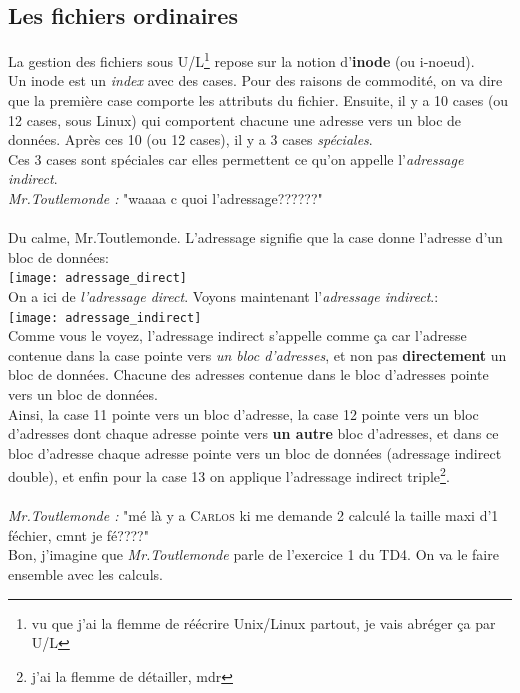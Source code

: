 \documentclass{report}
\begin{document}
\subsection{Les fichiers ordinaires}
La gestion des fichiers sous U/L\footnote{vu que j'ai la flemme de réécrire Unix/Linux partout, je vais abréger ça par U/L} repose sur la notion d'\textbf{inode} (ou i-noeud).\\
Un inode est un \emph{index} avec des cases. Pour des raisons de commodité, on va dire que la première case comporte les attributs du fichier. Ensuite, il y a 10 cases (ou 12 cases, sous Linux) qui comportent chacune une adresse vers un bloc de données. Après ces 10 (ou 12 cases), il y a 3 cases \emph{spéciales}.\\
Ces 3 cases sont spéciales car elles permettent ce qu'on appelle l'\emph{adressage indirect}.\newline
\\
\emph{Mr.Toutlemonde :} "waaaa c quoi l'adressage??????"\\
\\
Du calme, Mr.Toutlemonde. L'adressage signifie que la case donne l'adresse d'un bloc de données:
\\
\texttt{[image: adressage\_direct]}
\\
On a ici de \emph{l'adressage direct}. Voyons maintenant l'\emph{adressage indirect}.:
\\
\texttt{[image: adressage\_indirect]} \\
Comme vous le voyez, l'adressage indirect s'appelle comme ça car l'adresse contenue dans la case pointe vers \emph{un bloc d'adresses}, et non pas \textbf{directement} un bloc de données. Chacune des adresses contenue dans le bloc d'adresses pointe vers un bloc de données.\\
Ainsi, la case 11 pointe vers un bloc d'adresse, la case 12 pointe vers un bloc d'adresses dont chaque adresse pointe vers \textbf{un autre} bloc d'adresses, et dans ce bloc d'adresse chaque adresse pointe vers un bloc de données (adressage indirect double), et enfin pour la case 13 on applique l'adressage indirect triple\footnote{j'ai la flemme de détailler, mdr}.\\
\\
\emph{Mr.Toutlemonde :} "mé là y a \textsc{Carlos} ki me demande 2 calculé la taille maxi d'1 féchier, cmnt je fé????"
\\
Bon, j'imagine que \emph{Mr.Toutlemonde} parle de l'exercice 1 du TD4. On va le faire ensemble avec les calculs.\\
\end{document}
